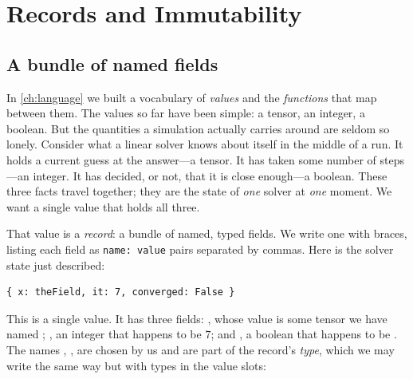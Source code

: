 \chapter{Records and Immutability}
\label{ch:records}


\section{A bundle of named fields}

In \cref{ch:language} we built a vocabulary of \emph{values} and the
\emph{functions} that map between them. The values so far have been simple: a
tensor, an integer, a boolean. But the quantities a simulation actually carries
around are seldom so lonely. Consider what a linear solver knows about itself in
the middle of a run. It holds a current guess at the answer---a tensor. It has
taken some number of steps---an integer. It has decided, or not, that it is
close enough---a boolean. These three facts travel together; they are the state
of \emph{one} solver at \emph{one} moment. We want a single value that holds all
three.

That value is a \emph{record}: a bundle of named, typed fields. We write one
with braces, listing each field as \lstinline[style=l4style]|name: value| pairs
separated by commas. Here is the solver state just described:

\begin{lstlisting}[style=l4style]
{ x: theField, it: 7, converged: False }
\end{lstlisting}

This is a single value. It has three fields: , whose value is some
tensor we have named ; , an integer that happens to be
$7$; and , a boolean that happens to be . The names
, ,  are chosen by us and are part of the
record's \emph{type}, which we may write the same way but with types in the
value slots:

